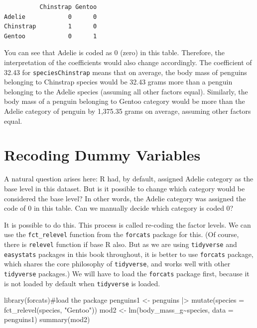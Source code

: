 \documentclass[
  letterpaper,
  paper =a4,
  twoside,
  openright,
  headsepline,
  footsepline,
  listof = totocnumbered,
  chapterprefix = true,
  firstiscover,
  parskip = full*]{scrbook}
\newenvironment{Shaded}{\begin{snugshade}}{\end{snugshade}}
\newcommand{\AttributeTok}[1]{\textcolor[rgb]{0.40,0.45,0.13}{#1}}
\newcommand{\CommentTok}[1]{\textcolor[rgb]{0.37,0.37,0.37}{#1}}
\newcommand{\FunctionTok}[1]{\textcolor[rgb]{0.28,0.35,0.67}{#1}}
\newcommand{\NormalTok}[1]{\textcolor[rgb]{0.00,0.23,0.31}{#1}}
\newcommand{\OtherTok}[1]{\textcolor[rgb]{0.00,0.23,0.31}{#1}}
\newcommand{\SpecialCharTok}[1]{\textcolor[rgb]{0.37,0.37,0.37}{#1}}
\newcommand{\StringTok}[1]{\textcolor[rgb]{0.13,0.47,0.30}{#1}}
\begin{document}
\begin{verbatim}
          Chinstrap Gentoo
Adelie            0      0
Chinstrap         1      0
Gentoo            0      1
\end{verbatim}

You can see that Adelie is coded as 0 (zero) in this table. Therefore,
the interpretation of the coefficients would also change accordingly.
The coefficient of 32.43 for \texttt{speciesChinstrap} means that on
average, the body mass of penguins belonging to Chinstrap species would
be 32.43 grams more than a penguin belonging to the Adelie species
(assuming all other factors equal). Similarly, the body mass of a
penguin belonging to Gentoo category would be more than the Adelie
category of penguin by 1,375.35 grams on average, assuming other factors
equal.

\section{Recoding Dummy Variables}\label{recoding-dummy-variables}

A natural question arises here: R had, by default, assigned Adelie
category as the base level in this dataset. But is it possible to change
which category would be considered the base level? In other words, the
Adelie category was assigned the code of 0 in this table. Can we
manually decide which category is coded 0?

It is possible to do this. This process is called re-coding the factor
levels. We can use the \texttt{fct\_relevel} function from the
\texttt{forcats} package for this. (Of course, there is \texttt{relevel}
function if base R also. But as we are using \texttt{tidyverse} and
\texttt{easystats} packages in this book throughout, it is better to use
\texttt{forcats} package, which shares the core philosophy of
\texttt{tidyverse}, and works well with other \texttt{tidyverse}
packages.) We will have to load the \texttt{forcats} package first,
because it is not loaded by default when \texttt{tidyverse} is loaded.

\begin{Shaded}
\begin{Highlighting}[]
\FunctionTok{library}\NormalTok{(forcats)}\CommentTok{\#load the package}
\NormalTok{penguins1 }\OtherTok{\textless{}{-}}\NormalTok{ penguins }\SpecialCharTok{|\textgreater{}} \FunctionTok{mutate}\NormalTok{(}\AttributeTok{species =} \FunctionTok{fct\_relevel}\NormalTok{(species, }\StringTok{"Gentoo"}\NormalTok{))}
\NormalTok{mod2 }\OtherTok{\textless{}{-}} \FunctionTok{lm}\NormalTok{(body\_mass\_g}\SpecialCharTok{\textasciitilde{}}\NormalTok{species, }\AttributeTok{data =}\NormalTok{ penguins1)}
\FunctionTok{summary}\NormalTok{(mod2)}
\end{Highlighting}
\end{Shaded}
\end{document}
